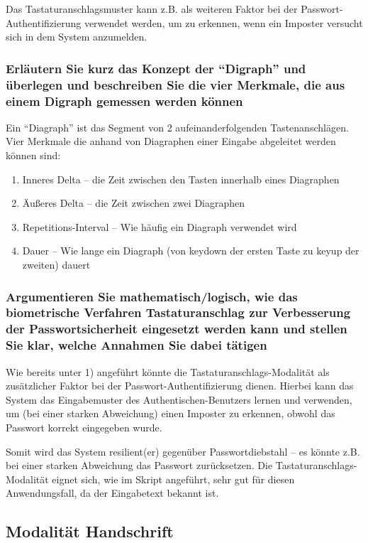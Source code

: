 \documentclass{article}
\begin{document}
Das Tastaturanschlagsmuster kann z.B. als weiteren Faktor bei der Passwort-Authentifizierung verwendet werden, um zu 
erkennen, wenn ein Imposter versucht sich in dem System anzumelden.

\subsubsection{Erläutern Sie kurz das Konzept der ``Digraph'' und überlegen und beschreiben Sie die vier Merkmale, die aus einem Digraph gemessen werden können}

Ein ``Diagraph'' ist das Segment von 2 aufeinanderfolgenden Tastenanschlägen.
Vier Merkmale die anhand von Diagraphen einer Eingabe abgeleitet werden können sind:

\begin{enumerate}
	\item Inneres Delta – die Zeit zwischen den Tasten innerhalb eines Diagraphen
	\item Äußeres Delta – die Zeit zwischen zwei Diagraphen
	\item Repetitions-Interval – Wie häufig ein Diagraph verwendet wird
	\item Dauer – Wie lange ein Diagraph (von keydown der ersten Taste zu keyup der zweiten) dauert
\end{enumerate}

\subsubsection{Argumentieren Sie mathematisch/logisch, wie das biometrische Verfahren Tastaturanschlag zur Verbesserung der Passwortsicherheit eingesetzt werden kann und stellen Sie klar, welche Annahmen Sie dabei tätigen}

Wie bereits unter 1) angeführt könnte die Tastaturanschlags-Modalität als zusätzlicher Faktor bei der 
Passwort-Authentifizierung dienen. Hierbei kann das System das Eingabemuster des Authentischen-Benutzers lernen und
verwenden, um (bei einer starken Abweichung) einen Imposter zu erkennen, obwohl das Passwort korrekt eingegeben wurde.

Somit wird das System resilient(er) gegenüber Passwortdiebstahl – es könnte z.B. bei einer starken Abweichung das 
Passwort zurücksetzen. Die Tastaturanschlags-Modalität eignet sich, wie im Skript angeführt, sehr gut für diesen
Anwendungsfall, da der Eingabetext bekannt ist.

\subsection{Modalität Handschrift}
\end{document}

